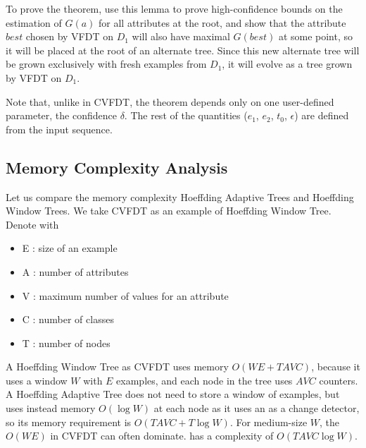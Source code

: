 To prove the theorem, use this lemma
to prove high-confidence bounds on the estimation of $G(a)$ for all attributes
at the root, and show that the attribute $best$ chosen by VFDT on $D_1$ 
will also have maximal $G(best)$ at some point, so it will be placed
at the root of an alternate tree. Since this new alternate tree will
be grown exclusively with fresh examples from $D_1$, it will evolve as 
a tree grown by VFDT on $D_1$. 

\BEGINOMIT
Note that, unlike in CVFDT, the theorem depends only on 
one user-defined parameter, the confidence $\delta$. 
The rest of the quantities ($e_1$, $e_2$, $t_0$, $\epsilon$) 
are defined from the input sequence. 
\ENDOMIT

\subsection{Memory Complexity Analysis}
\label{sComplexity}

Let us compare the memory complexity Hoeffding Adaptive Trees and Hoeffding Window Trees. We take CVFDT as an example
of Hoeffding Window Tree. Denote with 
%
\begin{itemize}
\item E : size of an example
\item A : number of attributes
\item V : maximum number of values for an attribute
\item C : number of classes
\item T : number of nodes %
\end{itemize}
%
A Hoeffding Window Tree as CVFDT uses memory $O(WE +TAVC)$, because it uses a window $W$
with $E$ examples, and each node in the tree uses $AVC$ counters. 
A Hoeffding Adaptive Tree does not need to store a window of examples, 
but uses instead memory $O(\log W)$ at each node as it uses an \adwin as a change detector, so its memory requirement is 
$O(TAVC+T\log W)$. For medium-size $W$, the $O(WE)$ in CVFDT can often dominate.
\HATAdwin %
has a complexity of $O(TAVC\log W)$. 



